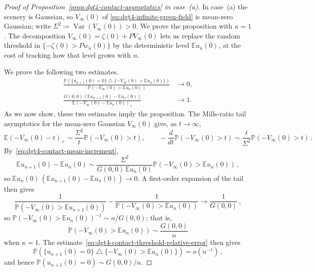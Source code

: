 \documentclass[11pt]{amsart}
\theoremstyle{plain}
\theoremstyle{definition}
\newcommand{\E}{\mathbb{E}}
\renewcommand{\P}{\mathbb{P}}
\DeclareMathOperator{\Var}{Var}
\begin{document}
\begin{proof}[Proof of Proposition~\ref{prop:dgt4-contact-asymptotics} in case~\textup{(a)}]
	In case~\textup{(a)} the scenery is Gaussian, so $V_\infty(0)$ of
	\eqref{eq:dgt4-infinite-green-field} is mean-zero Gaussian; write
	$\Sigma^2\coloneqq\Var(V_\infty(0))>0$. We prove the proposition with
	$\kappa=1$. The decomposition $V_\infty(0)=\zeta(0)+PV_\infty(0)$ lets us replace
	the random threshold in $\{-\zeta(0)>Pw_n(0)\}$ by the deterministic level
	$\E u_n(0)$, at the cost of tracking how that level grows with $n$.

	We prove the following two estimates.
	\begin{align}
	\frac{
	\P\left(
	\{u_{n+1}(0)=0\}
	\mathbin{\triangle}
	\{-V_\infty(0)>\E u_n(0)\}
	\right)}{\P(-V_\infty(0)>\E u_n(0))}
	&\longrightarrow0,
	\label{eq:dgt4-contact-threshold-relative-error}\\
	\frac{G(0,0)(\E u_{n+1}(0)-\E u_n(0))}{\E(-V_\infty(0)-\E u_n(0))_+}
	&\longrightarrow1 .
	\label{eq:dgt4-contact-mean-increment}
	\end{align}
	As we now show, these two estimates imply the proposition. The Mills-ratio tail
	asymptotics for the mean-zero Gaussian $V_\infty(0)$ give, as $t\to\infty$,
	\[
		\E(-V_\infty(0)-t)_+\sim\frac{\Sigma^2}{t}\P(-V_\infty(0)>t),
		\qquad
		-\frac{d}{dt}\P(-V_\infty(0)>t)\sim\frac{t}{\Sigma^2}\P(-V_\infty(0)>t)\, .
	\]
	By~\eqref{eq:dgt4-contact-mean-increment},
	\[
		\E u_{n+1}(0)-\E u_n(0)\sim\frac{\Sigma^2}{G(0,0)\,\E u_n(0)}\P(-V_\infty(0)>\E u_n(0))\, ,
	\]
	so $\E u_n(0)\,(\E u_{n+1}(0)-\E u_n(0))\to0$. A first-order expansion of the
	tail then gives
	\[
		\frac1{\P(-V_\infty(0)>\E u_{n+1}(0))}-\frac1{\P(-V_\infty(0)>\E u_n(0))}
		\longrightarrow\frac1{G(0,0)}\, ,
	\]
	so $\P(-V_\infty(0)>\E u_n(0))^{-1}\sim n/G(0,0)$; that is,
	\begin{equation}\label{eq:dgt4-threshold-probability}
		\P(-V_\infty(0)>\E u_n(0))\sim\frac{G(0,0)}{n}
	\end{equation}
	when $\kappa=1$. The estimate~\eqref{eq:dgt4-contact-threshold-relative-error} then gives
	\begin{equation}\label{eq:dgt4-contact-threshold-comparison}
		\P\left(
		\{u_{n+1}(0)=0\}
		\mathbin{\triangle}
		\{-V_\infty(0)>\E u_n(0)\}
		\right)=o(n^{-1})\, ,
	\end{equation}
	and hence $\P(u_{n+1}(0)=0)\sim G(0,0)/n$.  
	

\end{proof}
\end{document}
